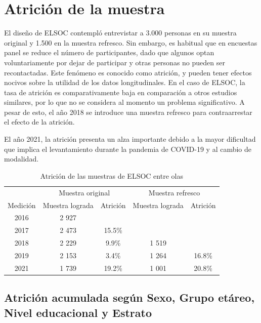 \documentclass[
  12pt,
]{book}
\begin{document}
\hypertarget{atriciuxf3n-de-la-muestra}{%
\section*{Atrición de la muestra}\label{atriciuxf3n-de-la-muestra}}

El diseño de ELSOC contempló entrevistar a 3.000 personas en su muestra original y 1.500 en la muestra refresco. Sin embargo, es habitual que en encuestas panel se reduce el número de participantes, dado que algunos optan voluntariamente por dejar de participar y otras personas no pueden ser recontactadas. Este fenómeno es conocido como atrición, y pueden tener efectos nocivos sobre la utilidad de los datos longitudinales. En el caso de ELSOC, la tasa de atrición es comparativamente baja en comparación a otros estudios similares, por lo que no se considera al momento un problema significativo. A pesar de esto, el año 2018 se introduce una muestra refresco para contraarrestar el efecto de la atrición.

El año 2021, la atrición presenta un alza importante debido a la mayor dificultad que implica el levantamiento durante la pandemia de COVID-19 y al cambio de modalidad.

\begin{table}

\caption{\label{tab:tabla-atricion}Atrición de las muestras de ELSOC entre olas}
\centering
\begin{tabular}[t]{c|c|c|c|c}
\hline
\multicolumn{1}{c|}{ } & \multicolumn{2}{c|}{Muestra original} & \multicolumn{2}{c}{Muestra refresco} \\
\cline{2-3} \cline{4-5}
Medición & Muestra lograda & Atrición & Muestra lograda & Atrición\\
\hline
2016 & 2 927 &  &  & \\
\hline
2017 & 2 473 & 15.5\% &  & \\
\hline
2018 & 2 229 & 9.9\% & 1 519 & \\
\hline
2019 & 2 153 & 3.4\% & 1 264 & 16.8\%\\
\hline
2021 & 1 739 & 19.2\% & 1 001 & 20.8\%\\
\hline
\end{tabular}
\end{table}

\hypertarget{atriciuxf3n-acumulada-seguxfan-sexo-grupo-etuxe1reo-nivel-educacional-y-estrato}{%
\subsection*{Atrición acumulada según Sexo, Grupo etáreo, Nivel educacional y Estrato}\label{atriciuxf3n-acumulada-seguxfan-sexo-grupo-etuxe1reo-nivel-educacional-y-estrato}}
\end{document}
